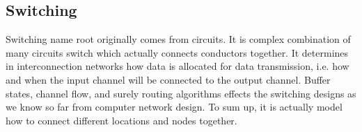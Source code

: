         \subsection{Switching}
        Switching name root originally comes from circuits. It is complex combination of many circuits switch which actually connects conductors together. It determines in interconnection networks how data is allocated for data transmission, i.e. how and when the input channel will be connected to the output channel. Buffer states, channel flow, and surely routing algorithms effects the switching designs as we know so far from computer network design. To sum up, it is actually model how to connect different locations and nodes together\cite{ComputerArchCoursera}.
